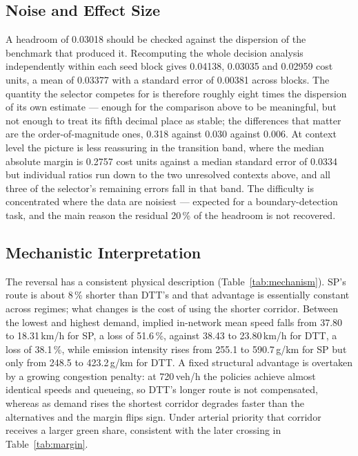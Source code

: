 \documentclass[runningheads]{llncs}
\begin{document}
\subsection{Noise and Effect Size}

A headroom of 0.03018 should be checked against the dispersion of the benchmark that
produced it. Recomputing the whole decision analysis independently within each seed block
gives 0.04138, 0.03035 and 0.02959 cost units, a mean of 0.03377 with a standard error of
0.00381 across blocks. The quantity the selector competes for is therefore roughly eight
times the dispersion of its own estimate --- enough for the comparison above to be
meaningful, but not enough to treat its fifth decimal place as stable; the differences
that matter are the order-of-magnitude ones, 0.318 against 0.030 against 0.006. At context
level the picture is less reassuring in the transition band, where the median absolute
margin is 0.2757 cost units against a median standard error of 0.0334 but individual
ratios run down to the two unresolved contexts above, and all three of the selector's
remaining errors fall in that band. The difficulty is concentrated where the data are
noisiest --- expected for a boundary-detection task, and the main reason the residual
20\,\% of the headroom is not recovered.

\subsection{Mechanistic Interpretation}

The reversal has a consistent physical description (Table~\ref{tab:mechanism}). SP's route
is about 8\,\% shorter than DTT's and that advantage is essentially constant across
regimes; what changes is the cost of using the shorter corridor. Between the lowest and
highest demand, implied in-network mean speed falls from 37.80 to 18.31\,km/h for SP, a
loss of 51.6\,\%, against 38.43 to 23.80\,km/h for DTT, a loss of 38.1\,\%, while emission
intensity rises from 255.1 to 590.7\,g/km for SP but only from 248.5 to 423.2\,g/km for
DTT. A fixed structural advantage is overtaken by a growing congestion penalty: at
720\,veh/h the policies achieve almost identical speeds and queueing, so DTT's longer route
is not compensated, whereas as demand rises the shortest corridor degrades faster than the
alternatives and the margin flips sign. Under arterial priority that corridor receives a
larger green share, consistent with the later crossing in Table~\ref{tab:margin}.
\end{document}
